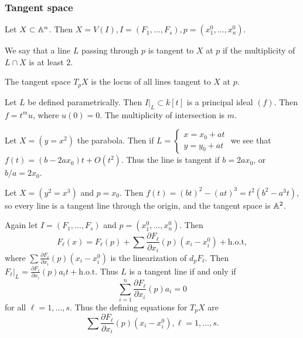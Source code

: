 \documentclass[twoside, 10pt]{article}
\begin{document}
    \subsubsection{Tangent space}%
    Let $X \subset \mathbb{A}^n$. Then $X = V(I), I = (F_1, \ldots, F_s), p = (x_1^0, \ldots, x_n^0)$.

    \begin{defn}
        We say that a line $L$ passing through $p$ is tangent to $X$ at $p$ if the multiplicity of $L \cap X$ is at least $2$.
    \end{defn}

    \begin{defn}
        The tangent space $T_pX$ is the locus of all lines tangent to $X$ at $p$.
    \end{defn}

    \begin{defn}[Multiplicity]
        Let $L$ be defined parametrically. Then $I|_L \subset k[t]$ is a principal ideal $(f)$. Then $f = t^mu$, where $u(0) = 0$. The multiplicity of intersection is $m$.
    \end{defn}

    \begin{exm}
        Let $X = (y=x^2)$ the parabola. Then if $L = \begin{cases}
            x = x_0+at \\
            y = y_0+at
        \end{cases}$ we see that $f(t) = (b-2ax_0)t + O(t^2)$. Thus the line is tangent if $b = 2ax_0$, or $b/a = 2x_0$.
    \end{exm}

    \begin{exm}
        Let $X = (y^2=x^3)$ and $p = x_0$. Then $f(t) = (bt)^2 - (at)^3 = t^2(b^2-a^3t)$, so every line is a tangent line through the origin, and the tangent space is $\mathbb{A}^2$.
    \end{exm}

    Again let $I = (F_1, \ldots, F_s)$ and $p = (x_1^0, \ldots, x_n^0)$. Then \[F_{\ell}(x) = F_{\ell}(p) + \sum \frac{\partial F_{\ell}}{\partial x_i}(p)(x_i - x_i^0) + \mathrm{h.o.t}, \] where $\sum \frac{\partial F_{\ell}}{\partial x_i}(p)(x_i - x_i^0)$ is the linearization of $d_pF_{\ell}$. Then $F_{\ell}|_L = \frac{\partial F_{\ell}}{\partial x_i}(p)a_it + \mathrm{h.o.t}$. Thus $L$ is a tangent line if and only if \[\sum_{i=1}^n \frac{\partial F_{\ell}}{\partial x_i}(p) a_i = 0 \] for all $\ell = 1, \ldots, s$. Thus the defining equations for $T_pX$ are \[\sum \frac{\partial F_{\ell}}{\partial x_i}(p)(x_i - x_i^0), \ell = 1, \ldots, s.\]
\end{document}
